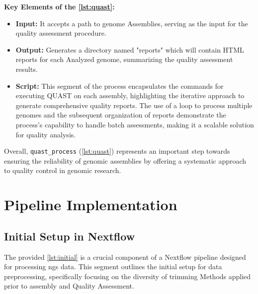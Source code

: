 \textbf{Key Elements of the \autoref{lst:quast}:}

\begin{itemize}
    \item \textbf{Input:} It accepts a path to \gls{genome} Assemblies, serving as the input for the quality assessment procedure.
    \item \textbf{Output:} Generates a directory named "reports" which will contain HTML reports for each Analyzed \gls{genome}, summarizing the quality assessment results.
    \item \textbf{Script:} This segment of the process encapsulates the commands for executing QUAST on each \gls{assembly}, highlighting the iterative approach to generate comprehensive quality reports. The use of a loop to process multiple \gls{genome}s and the subsequent organization of reports demonstrate the process's capability to handle batch assessments, making it a scalable solution for quality analysis.
\end{itemize}

Overall, \texttt{quast\_process} (\autoref{lst:quast}) represents an important step towards ensuring the reliability of genomic assemblies by offering a systematic approach to quality control in genomic research.













\section{Pipeline Implementation}

\subsection{Initial Setup in Nextflow}

The provided \autoref{lst:initial} is a crucial component of a Nextflow pipeline designed for processing \gls{ngs} data. This segment outlines the initial setup for data preprocessing, specifically focusing on the diversity of \gls{trimming} Methods applied prior to \gls{assembly} and Quality Assessment.

